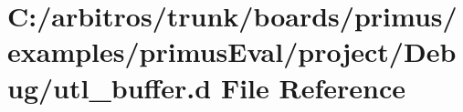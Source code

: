 \hypertarget{boards_2primus_2examples_2primus_eval_2project_2_debug_2utl__buffer_8d}{\section{C\-:/arbitros/trunk/boards/primus/examples/primus\-Eval/project/\-Debug/utl\-\_\-buffer.d File Reference}
\label{boards_2primus_2examples_2primus_eval_2project_2_debug_2utl__buffer_8d}
}
